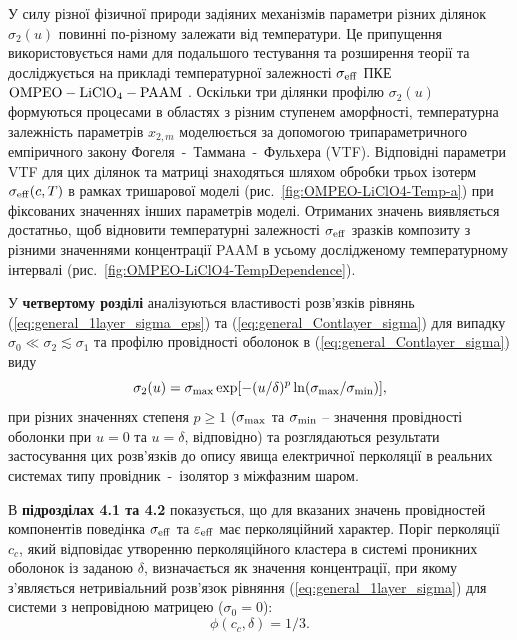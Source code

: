 \documentclass[twoside,a4paper,14pt]{vakaref}
\begin{document}
У силу різної фізичної природи задіяних механізмів параметри різних ділянок $\sigma_2(u)$ повинні по-різному залежати від температури. Це припущення використовується нами для подальшого тестування та розширення теорії та досліджується на прикладі температурної залежності $\sigma_{\rm eff}$ ПКЕ $\rm OMPEO-LiClO_4-PAAM$ \cite{Wiec1994}. 
Оскільки три ділянки профілю $\sigma_2(u)$  формуються процесами в  областях з різним ступенем аморфності, температурна залежність параметрів $x_{2,m}$ моделюється за допомогою трипараметричного емпіричного закону Фогеля~-~Таммана~-~Фульхера (VTF).
Відповідні параметри VTF для цих ділянок та матриці знаходяться шляхом обробки трьох ізотерм $\sigma_{\rm eff} (c,T)$ в рамках тришарової моделі (рис.~\ref{fig:OMPEO-LiClO4-Temp-a}) при фіксованих значеннях інших параметрів моделі. 
Отриманих значень виявляється достатньо, щоб відновити температурні залежності $\sigma_{\rm eff}$ зразків композиту з різними значеннями концентрації PAAM в усьому дослідженому температурному інтервалі (рис.~\ref{fig:OMPEO-LiClO4-TempDependence}). 

У {\bf четвертому розділі} аналізуються властивості розв'язків рівнянь (\ref{eq:general_1layer_sigma_eps}) та (\ref{eq:general_Contlayer_sigma}) для випадку $\sigma_0 \ll \sigma_2 \lesssim \sigma_1$ та профілю провідності оболонок в (\ref{eq:general_Contlayer_sigma}) виду
\begin{equation}\label{eq:profile-perc}
\sigma_2 (u) = \sigma_{\rm max} \exp [-(u/\delta)^p \ln(\sigma_{\rm max}/\sigma_{\rm min})],
\end{equation}
при різних значеннях степеня $p\geq 1$ ($\sigma_{\rm max}$ та $\sigma_{\rm min}$ -- значення провідності оболонки при $u=0$
та $u=\delta$, відповідно) та розглядаються результати застосування цих розв'язків до опису явища електричної перколяції в реальних системах типу провідник~-~ізолятор з міжфазним шаром.

В {\bf підрозділах 4.1 та 4.2} показується, що для вказаних значень провідностей ком\-понентів поведінка $\sigma_{\rm eff}$ та $\varepsilon_{\rm eff}$ має перколяційний характер. Поріг перколяції $c_c$, який відповідає утворенню перколяційного кластера в системі проникних оболонок із заданою $\delta$, визначається як значення концентрації, при якому з'являється нетривіальний розв'язок рівняння (\ref{eq:general_1layer_sigma}) для системи з непровідною матрицею ($\sigma_0 = 0$):
\begin{equation}\label{eq:threshold}
\phi(c_c, \delta) = 1/3.
\end{equation}
\end{document}
